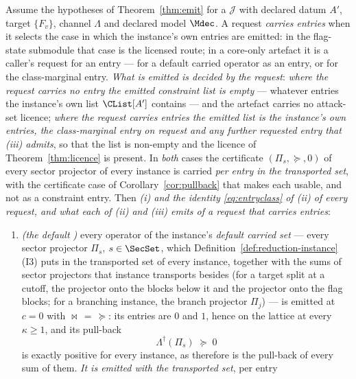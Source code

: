 \begin{corollary}\label{cor:entries}
Assume the hypotheses of Theorem~\ref{thm:emit} for a 
$\mathcal{J}$ with declared datum $A'$, target $\{F_v\}$, channel $\Lambda$
and declared model $\Mdec$. A request \emph{carries entries} when it selects
the case in which the instance's own entries are emitted: in the flag-state
submodule that case is the licensed route; in a core-only artefact it is a
caller's request for an entry --- for a default carried operator as an entry,
or for the class-marginal entry. \emph{What is emitted is decided by the
request}: \emph{where the request carries no entry the emitted constraint
list is empty} --- whatever entries the instance's own list $\CList[A']$
contains --- and the artefact carries no attack-set licence; \emph{where the
request carries entries the emitted list is the instance's own entries, the
class-marginal entry on request and any further requested entry that (iii)
admits}, so that
the list is non-empty and the licence of Theorem~\ref{thm:licence} is
present. In \emph{both} cases the
certificate $(\Pi_s,\succeq,0)$ of every sector projector of every instance
is carried \emph{per entry in the transported set}, with the certificate case
of Corollary~\ref{cor:pullback} that makes each usable, and not as a
constraint entry. Then
\emph{(i) and the identity \eqref{eq:entryclass} of (ii) of every request,
and what each of (ii) and (iii) emits of a request that carries entries}:
\begin{enumerate}[label=(\roman*),leftmargin=3.0em]
\item \emph{(the default )} every operator of the
  instance's \emph{default carried set} --- every sector projector $\Pi_s$,
  $s\in\SecSet$, which Definition~\ref{def:reduction-instance}\,(I3) puts in
  the transported set of every instance, together with the sums of sector
  projectors that instance transports besides (for a target split at a
  cutoff, the projector onto the blocks below it and the projector onto the
  flag blocks; for a branching instance, the branch projector $\Pi_j$) ---
  is emitted at $c=0$ with $\bowtie\,=\,\succeq$: its entries
  are $0$ and $1$, hence on the lattice at every $\kappa\ge1$, and its
  pull-back
  \begin{equation}\label{eq:entrysector}
    \Lambda^{\dagger}(\Pi_s)\;\succeq\;0
  \end{equation}
  is exactly positive for every instance, as therefore is the pull-back of
  every sum of them. \emph{It is emitted with the transported set}, per entry

\end{enumerate}
\end{corollary}
